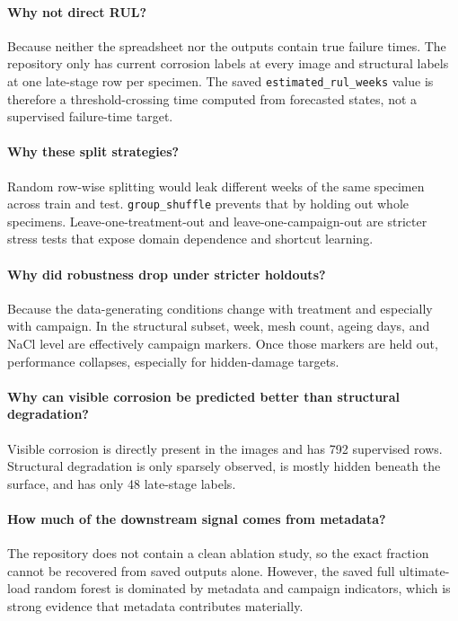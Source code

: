 \documentclass[11pt,a4paper]{article}
\begin{document}
\paragraph{Why not direct RUL?}
Because neither the spreadsheet nor the outputs contain true failure times. The repository only has current corrosion labels at every image and structural labels at one late-stage row per specimen. The saved \texttt{estimated\_rul\_weeks} value is therefore a threshold-crossing time computed from forecasted states, not a supervised failure-time target.

\paragraph{Why these split strategies?}
Random row-wise splitting would leak different weeks of the same specimen across train and test. \texttt{group\_shuffle} prevents that by holding out whole specimens. Leave-one-treatment-out and leave-one-campaign-out are stricter stress tests that expose domain dependence and shortcut learning.

\paragraph{Why did robustness drop under stricter holdouts?}
Because the data-generating conditions change with treatment and especially with campaign. In the structural subset, week, mesh count, ageing days, and NaCl level are effectively campaign markers. Once those markers are held out, performance collapses, especially for hidden-damage targets.

\paragraph{Why can visible corrosion be predicted better than structural degradation?}
Visible corrosion is directly present in the images and has 792 supervised rows. Structural degradation is only sparsely observed, is mostly hidden beneath the surface, and has only 48 late-stage labels.

\paragraph{How much of the downstream signal comes from metadata?}
The repository does not contain a clean ablation study, so the exact fraction cannot be recovered from saved outputs alone. However, the saved full ultimate-load random forest is dominated by metadata and campaign indicators, which is strong evidence that metadata contributes materially.
\end{document}
